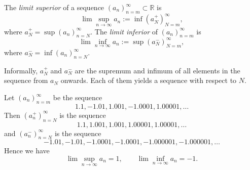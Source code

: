\begin{defn}
  \label{def:limSupLimInf}
  The \emph{limit superior} of a sequence
  $(a_n)_{n=m}^{\infty}\subset \mathbb{R}$ is
  \begin{equation}
    \label{eq:limsup}
    \lim \sup_{n\rightarrow \infty} a_n := \inf (a_N^+)_{N=m}^{\infty}, 
  \end{equation}
  where $a_N^+=\sup(a_n)_{n=N}^{\infty}$.
  The \emph{limit inferior} of $(a_n)_{n=m}^{\infty}$ is
  \begin{equation}
    \label{eq:liminf}
    \lim \inf_{n\rightarrow \infty} a_n := \sup (a_N^-)_{N=m}^{\infty}, 
  \end{equation}
  where $a_N^-=\inf(a_n)_{n=N}^{\infty}$.
\end{defn}

\begin{rem}
  Informally, $a_N^+$ and $a_N^-$ are the supremum and infimum
  of all elements in the sequence from $a_N$ onwards.
  Each of them yields a sequence with respect to $N$.
\end{rem}

\begin{exm}
  Let $(a_n)_{n=m}^{\infty}$ be the sequence
  \begin{displaymath}
    1.1, -1.01, 1.001, -1.0001, 1.00001, \ldots
  \end{displaymath}
  Then $(a_n^+)_{n=N}^{\infty}$ is the sequence
  \begin{displaymath}
    1.1, 1.001, 1.001, 1.00001, 1.00001, \ldots
  \end{displaymath}
  and $(a_n^-)_{n=N}^{\infty}$ is the sequence
  \begin{displaymath}
    -1.01, -1.01, -1.0001, -1.0001, -1.000001, -1.000001, \ldots
  \end{displaymath}
  Hence we have
  \begin{displaymath}
    \lim \sup_{n\rightarrow \infty} a_n = 1, \qquad
    \lim \inf_{n\rightarrow \infty} a_n = -1.
  \end{displaymath}
\end{exm}

